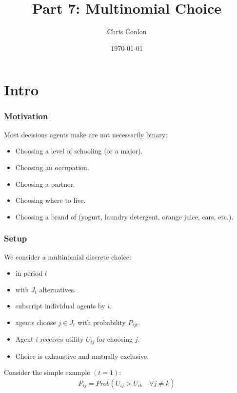 \documentclass[xcolor=pdftex,dvipsnames,table,mathserif]{beamer}
\begin{document}
\title{Part 7: Multinomial Choice}
\author{Chris Conlon}
\date{\today}

\frame{\titlepage}

\section{Intro}

\begin{frame}
\frametitle{Motivation}
Most decisions agents make are not necessarily binary:
\begin{itemize}
\item Choosing a level of schooling (or a major).
\item Choosing an occupation.
\item Choosing a partner.
\item Choosing where to live.
\item Choosing a brand of (yogurt, laundry detergent, orange juice, cars, etc.).
 \end{itemize}
\end{frame}

\begin{frame}
\frametitle{Setup}
We consider a \alert{multinomial discrete choice}:
\begin{itemize}
\item in period $t$
\item with $J_t$ alternatives.
\item subscript individual agents by $i$.
\item agents choose $j \in J_t$ with probability $P_{ijt}$.
\item Agent $i$ receives utility $U_{ij}$ for choosing $j$.
\item Choice is exhaustive and mutually exclusive.
 \end{itemize}\pause
Consider the simple example $(t=1)$:
\begin{eqnarray*}
P_{ij} = Prob( U_{ij} > U_{ik} \quad \forall j \neq k)
\end{eqnarray*}
\end{frame}
\end{document}
